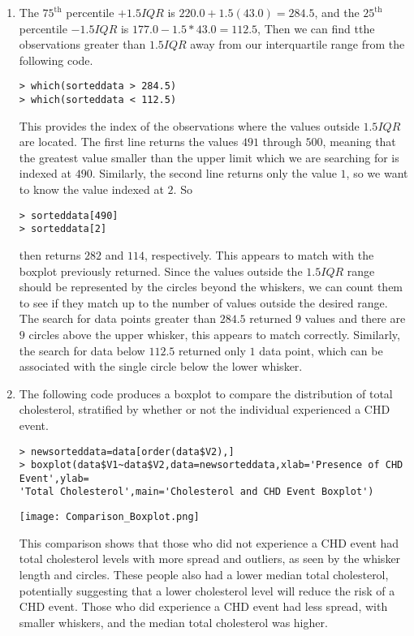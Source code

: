 \documentclass[a4paper]{article}
\begin{document}
\begin{enumerate}[label=(\alph*)]
\item The $75^{\text{th}}$ percentile $+ 1.5 IQR$ is $220.0+1.5(43.0)=284.5$, and the $25^{\text{th}}$ percentile $- 1.5 IQR$ is $177.0-1.5*43.0=112.5$, Then we can find tthe observations greater than $1.5 IQR$ away from our interquartile range from the following code.
\begin{verbatim}
> which(sorteddata > 284.5)
> which(sorteddata < 112.5)
\end{verbatim}
This provides the index of the observations where the values outside $1.5 IQR$ are located. The first line returns the values $491$ through $500$, meaning that the greatest value smaller than the upper limit which we are searching for is indexed at $490$. Similarly, the second line returns only the value $1$, so we want to know the value indexed at $2$. So
\begin{verbatim}
> sorteddata[490]
> sorteddata[2]
\end{verbatim}
then returns $282$ and $114$, respectively. This appears to match with the boxplot previously returned. Since the values outside the $1.5 IQR$ range should be represented by the circles beyond the whiskers, we can count them to see if they match up to the number of values outside the desired range. The search for data points greater than $284.5$ returned $9$ values and there are $9$ circles above the upper whisker, this appears to match correctly. Similarly, the search for data below $112.5$ returned only $1$ data point, which can be associated with the single circle below the lower whisker. 

\item The following code produces a boxplot to compare the distribution of total cholesterol, stratified by whether or not the individual experienced a CHD event.
\begin{verbatim}
> newsorteddata=data[order(data$V2),]
> boxplot(data$V1~data$V2,data=newsorteddata,xlab='Presence of CHD Event',ylab=
'Total Cholesterol',main='Cholesterol and CHD Event Boxplot')
\end{verbatim}
\begin{center}
\texttt{[image: Comparison\_Boxplot.png]}
\end{center}
This comparison shows that those who did not experience a CHD event had total cholesterol levels with more spread and outliers, as seen by the whisker length and circles. These people also had a lower median total cholesterol, potentially suggesting that a lower cholesterol level will reduce the risk of a CHD event. Those who did experience a CHD event had less spread, with smaller whiskers, and the median total cholesterol was higher.

\end{enumerate}
\end{document}
